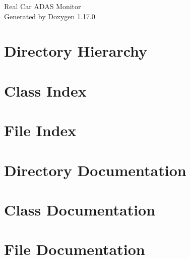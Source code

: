 \documentclass[twoside]{book}
\newcommand{\+}{\discretionary{\mbox{\scriptsize$\hookleftarrow$}}{}{}}
\newcommand{\clearemptydoublepage}{%
    \newpage{\pagestyle{empty}\cleardoublepage}%
  }
\begin{document}
  \raggedbottom
    \hypersetup{pageanchor=false,
                bookmarksnumbered=true,
                pdfencoding=unicode
               }
  \begin{titlepage}
  \vspace*{7cm}
  \begin{center}%
  {\Large Real Car ADAS Monitor}\\
  \vspace*{1cm}
  {\large Generated by Doxygen 1.17.0}\\
  \end{center}
  \end{titlepage}
  \clearemptydoublepage
  \tableofcontents
  \clearemptydoublepage
  \hypersetup{pageanchor=true}
\chapter{Directory Hierarchy}

\chapter{Class Index}

\chapter{File Index}

\chapter{Directory Documentation}

\chapter{Class Documentation}









\chapter{File Documentation}



















  \backmatter
  \newpage
  \clearemptydoublepage
  \printindex
\end{document}
